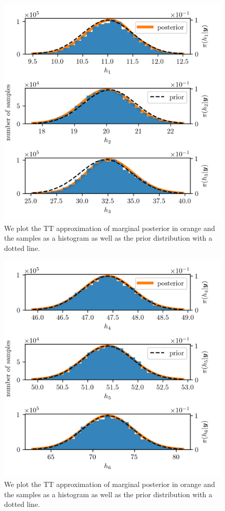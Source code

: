 \begin{figure}[ht!]
	\centering
	\includegraphics{PHdPTPost0.png}
	\caption[Histograms and TT approximation of posterior distribution as well as hyper-prior distribution.]{We plot the TT approximation of marginal posterior in orange and the samples as a histogram as well as the prior distribution with a dotted line.}
	\label{fig:PostHistTT0}
\end{figure}
\begin{figure}[ht!]
	\centering
	\includegraphics{PHdPTPost1.png}
	\caption[Histograms and TT approximation of posterior distribution as well as hyper-prior distribution.]{We plot the TT approximation of marginal posterior in orange and the samples as a histogram as well as the prior distribution with a dotted line.}
	\label{fig:PostHistTT1}
\end{figure}
